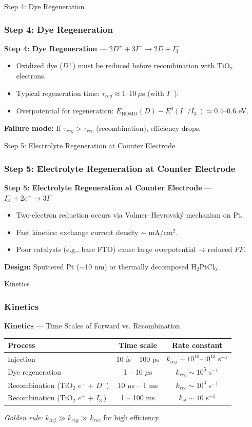 \documentclass[aspectratio=169]{beamer}
\begin{document}
\begin{frame}{Step 4: Dye Regeneration}
\frametitle{Step 4: Dye Regeneration}

\textbf{Step 4: Dye Regeneration} — $2D^+ + 3I^- \rightarrow 2D + I_3^-$
\begin{itemize}
\item Oxidized dye ($D^+$) must be reduced before recombination with TiO$_2$ electrons.
\item Typical regeneration time: $\tau_{reg} \approx 1–10\ \mu$s (with $I^-$).
\item Overpotential for regeneration: $E_{\text{HOMO}}(D) - E^0(I^-/I_3^-) \approx 0.4–0.6$ eV.
\end{itemize}
\textbf{Failure mode:} If $\tau_{reg} > \tau_{rec}$ (recombination), efficiency drops.
\cite{Clifford2011}
\end{frame}


\begin{frame}{Step 5: Electrolyte Regeneration at Counter Electrode}
\frametitle{Step 5: Electrolyte Regeneration at Counter Electrode}

\textbf{Step 5: Electrolyte Regeneration at Counter Electrode} — $I_3^- + 2e^- \rightarrow 3I^-$
\begin{itemize}
\item Two-electron reduction occurs via Volmer–Heyrovský mechanism on Pt.
\item Fast kinetics: exchange current density $\sim$ mA/cm$^2$.
\item Poor catalysts (e.g., bare FTO) cause large overpotential → reduced $FF$.
\end{itemize}
\textbf{Design:} Sputtered Pt ($\sim$10 nm) or thermally decomposed H$_2$PtCl$_6$.
\cite{Hilgendorff2000}
\end{frame}


\begin{frame}{Kinetics}
\frametitle{Kinetics}

\textbf{Kinetics} — Time Scales of Forward vs. Recombination
\begin{table}
\centering
\begin{tabular}{lcc}
\toprule
Process & Time scale & Rate constant \\
\midrule
Injection & 10 fs – 100 ps & $k_{inj} \sim 10^{10} – 10^{13}$ s$^{-1}$ \\
Dye regeneration & 1 – 10 $\mu$s & $k_{reg} \sim 10^{5}$ s$^{-1}$ \\
Recombination (TiO$_2$ $e^-$ + $D^+$) & 10 $\mu$s – 1 ms & $k_{rec} \sim 10^{3}$ s$^{-1}$ \\
Recombination (TiO$_2$ $e^-$ + $I_3^-$) & 1 – 100 ms & $k_{ct} \sim 10$ s$^{-1}$ \\
\bottomrule
\end{tabular}
\end{table}
\textit{Golden rule:} $k_{inj} \gg k_{reg} \gg k_{rec}$ for high efficiency.
\cite{Durrant2004}
\end{frame}
\end{document}
